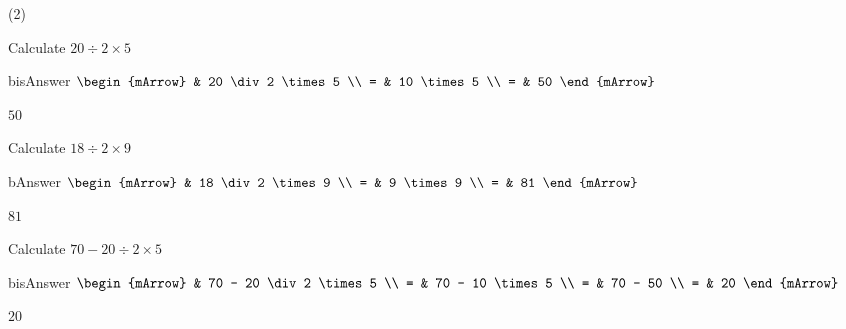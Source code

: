 \begin{mtask}[resume](2)
   \task \begin{exercise} Calculate $ 20 \div 2 \times 5    $
           \begin{envOut}[height=6cm]{bisAnswer}
             $\begin{mArrow} 
			       & 20 \div 2 \times 5               \\
                 = & 10 \times 5                   \\
		   		 = & 50 
              \end{mArrow}$
            \begin{shortsolution}  
			     $50$
			\end{shortsolution}				 
           \end{envOut}
         \end{exercise}

   \task \begin{exercise} Calculate $ 18 \div 2 \times 9    $
           \begin{envOut}[height=6cm]{bAnswer}
             $\begin{mArrow} 
			       & 18 \div 2 \times 9               \\
                 = & 9 \times 9                   \\
		   		 = & 81 
              \end{mArrow}$
            \begin{shortsolution}  
			     $81$
			\end{shortsolution}				 
           \end{envOut}
         \end{exercise}

   \task \begin{exercise} Calculate $ 70 - 20 \div 2 \times 5    $
           \begin{envOut}[height=6cm]{bisAnswer}
             $\begin{mArrow} 
			       & 70 - 20 \div 2 \times 5               \\
                 = & 70 - 10 \times 5                    \\
		   		 = & 70 - 50                             \\
				 = & 20 
              \end{mArrow}$
            \begin{shortsolution}  
			     $20$
			\end{shortsolution}				 
           \end{envOut}
         \end{exercise}


\end{mtask}
